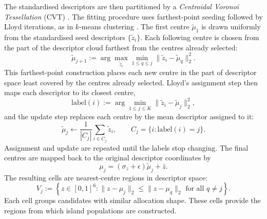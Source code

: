 The standardised descriptors are then partitioned by a \emph{Centroidal Voronoi Tessellation} (CVT) \citep[Appendix~\ref{sec:appendix_cvt}]{du1999centroidal}. The fitting procedure uses farthest-point seeding followed by Lloyd iterations, as in $k$-means clustering \citep{lloyd1982least,macqueen1967classification}. The first centre $\tilde\mu_1$ is drawn uniformly from the standardised seed descriptors $\{\tilde z_i\}$. Each following centre is chosen from the part of the descriptor cloud farthest from the centres already selected:
\[
\tilde\mu_{j+1}
:=
\arg\max_{\tilde z_i}
\min_{1\le q\le j}
\|\tilde z_i-\tilde\mu_q\|_2^2 .
\]
This farthest-point construction places each new centre in the part of descriptor space least covered by the centres already selected. Lloyd's assignment step then maps each descriptor to its closest centre,
\[
\mathrm{label}(i)
:=
\arg\min_{1\le j\le K}
\|\tilde z_i-\tilde\mu_j\|_2^2,
\]
and the update step replaces each centre by the mean descriptor assigned to it:
\[
\tilde\mu_j
\leftarrow
\frac{1}{|C_j|}
\sum_{i\in C_j}\tilde z_i,
\qquad
C_j=\{i:\mathrm{label}(i)=j\}.
\]
Assignment and update are repeated until the labels stop changing. The final centres are mapped back to the original descriptor coordinates by
\[
\mu_j=(\sigma_z+\epsilon)\tilde\mu_j+\bar z .
\]
The resulting cells are nearest-centre regions in descriptor space:
\[
V_j
:=
\left\{
z\in[0,1]^6:
\|z-\mu_j\|_2
\le
\|z-\mu_q\|_2
\text{ for all }q\ne j
\right\}.
\]
Each cell groups candidates with similar allocation shape. These cells provide the regions from which island populations are constructed.


